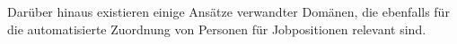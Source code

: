 Darüber hinaus existieren einige Ansätze verwandter Domänen, die ebenfalls für die automatisierte Zuordnung von Personen für Jobpositionen relevant sind.


